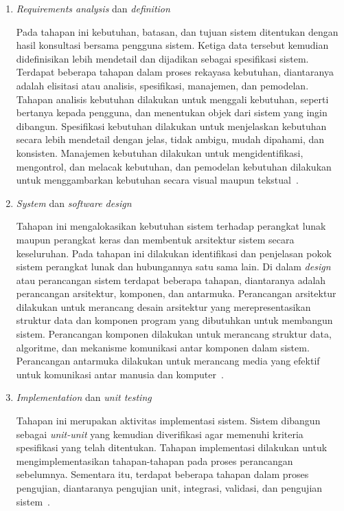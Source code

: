 \begin{enumerate}[
  leftmargin=0pt, itemindent=20pt,
  labelwidth=15pt, labelsep=5pt, listparindent=0.7cm,
  align=left]

\item \emph{Requirements analysis} dan \emph{definition}

  Pada tahapan ini kebutuhan, batasan, dan tujuan sistem ditentukan
  dengan hasil konsultasi bersama pengguna sistem. Ketiga data tersebut
  kemudian didefinisikan lebih mendetail dan dijadikan sebagai
  spesifikasi sistem. Terdapat beberapa tahapan dalam proses rekayasa kebutuhan,
  diantaranya adalah elisitasi atau analisis, spesifikasi, manajemen, dan
  pemodelan. Tahapan analisis kebutuhan dilakukan untuk menggali kebutuhan,
  seperti bertanya kepada pengguna, dan menentukan objek dari sistem yang ingin
  dibangun. Spesifikasi kebutuhan dilakukan untuk menjelaskan kebutuhan secara
  lebih mendetail dengan jelas, tidak ambigu, mudah dipahami, dan
  konsisten. Manajemen kebutuhan dilakukan untuk mengidentifikasi, mengontrol,
  dan melacak kebutuhan, dan pemodelan kebutuhan dilakukan untuk menggambarkan
  kebutuhan secara visual maupun tekstual~\parencite{pressman2010software}.

\item \emph{System} dan \emph{software design}

  Tahapan ini mengalokasikan kebutuhan sistem terhadap perangkat lunak
  maupun perangkat keras dan membentuk arsitektur sistem secara
  keseluruhan. Pada tahapan ini dilakukan identifikasi dan penjelasan
  pokok sistem perangkat lunak dan hubungannya satu sama lain. Di dalam
  \emph{design} atau perancangan sistem terdapat beberapa tahapan, diantaranya
  adalah perancangan arsitektur, komponen, dan antarmuka. Perancangan arsitektur
  dilakukan untuk merancang desain arsitektur yang merepresentasikan struktur
  data dan komponen program yang dibutuhkan untuk membangun sistem. Perancangan
  komponen dilakukan untuk merancang struktur data, algoritme, dan mekanisme
  komunikasi antar komponen dalam sistem. Perancangan antarmuka dilakukan untuk
  merancang media yang efektif untuk komunikasi antar manusia dan
  komputer~\parencite{pressman2010software}.

\item \emph{Implementation} dan \emph{unit testing}

  Tahapan ini merupakan aktivitas implementasi sistem. Sistem dibangun sebagai
  \emph{unit-unit} yang kemudian diverifikasi agar memenuhi kriteria
  spesifikasi yang telah ditentukan. Tahapan implementasi dilakukan untuk
  mengimplementasikan tahapan-tahapan pada proses perancangan
  sebelumnya. Sementara itu, terdapat beberapa tahapan dalam proses pengujian,
  diantaranya pengujian unit, integrasi, validasi, dan pengujian
  sistem~\parencite{pressman2010software}.


\end{enumerate}
